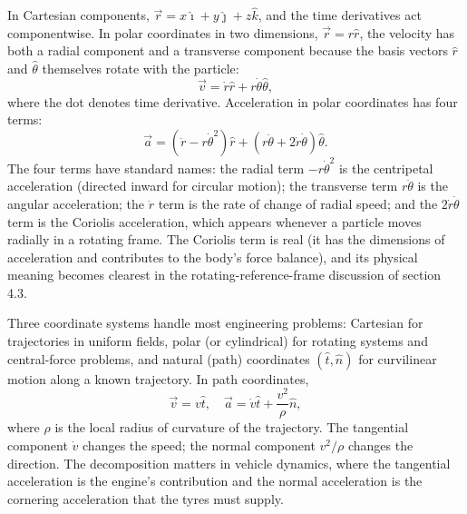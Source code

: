 In Cartesian components, $\vec{r} = x\hat{\imath} + y\hat{\jmath} +
z\hat{k}$, and the time derivatives act componentwise. In polar
coordinates in two dimensions, $\vec{r} = r\hat{r}$, the velocity
has both a radial component and a transverse component because the
basis vectors $\hat{r}$ and $\hat{\theta}$ themselves rotate with the
particle:
\[
\vec{v} = \dot{r}\hat{r} + r\dot{\theta}\hat{\theta},
\]
where the dot denotes time derivative. Acceleration in polar
coordinates has four terms:
\[
\vec{a} = (\ddot{r} - r\dot{\theta}^2)\hat{r} + (r\ddot{\theta} + 2
\dot{r}\dot{\theta})\hat{\theta}.
\]
The four terms have standard names: the radial term $-r\dot{\theta}^2$
is the centripetal acceleration (directed inward for circular motion);
the transverse term $r\ddot{\theta}$ is the angular acceleration; the
$\ddot{r}$ term is the rate of change of radial speed; and the
$2\dot{r}\dot{\theta}$ term is the Coriolis acceleration, which
appears whenever a particle moves radially in a rotating frame. The
Coriolis term is real (it has the dimensions of acceleration and
contributes to the body's force balance), and its physical meaning
becomes clearest in the rotating-reference-frame discussion of
section 4.3.

Three coordinate systems handle most engineering problems: Cartesian
for trajectories in uniform fields, polar (or cylindrical) for
rotating systems and central-force problems, and natural (path)
coordinates $(\hat{t}, \hat{n})$ for curvilinear motion along a known
trajectory. In path coordinates,
\[
\vec{v} = v\hat{t}, \quad \vec{a} = \dot{v}\hat{t} + \frac{v^2}{\rho}
\hat{n},
\]
where $\rho$ is the local radius of curvature of the trajectory. The
tangential component $\dot{v}$ changes the speed; the normal component
$v^2/\rho$ changes the direction. The decomposition matters in vehicle
dynamics, where the tangential acceleration is the engine's
contribution and the normal acceleration is the cornering acceleration
that the tyres must supply.

